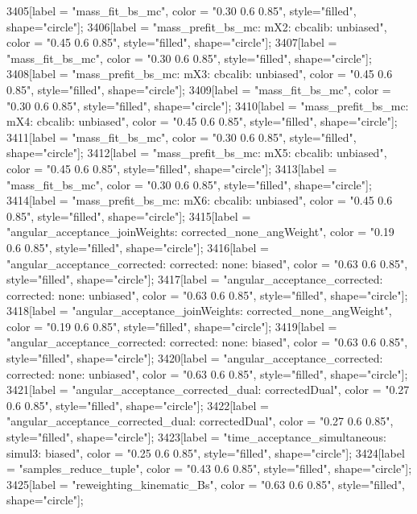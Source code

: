 {	3405[label = "mass_fit_bs_mc", color = "0.30 0.6 0.85", style="filled", shape="circle"];
	3406[label = "mass_prefit_bs_mc\nmassbin: mX2\nmassmodel: cbcalib\ntrigger: unbiased", color = "0.45 0.6 0.85", style="filled", shape="circle"];
	3407[label = "mass_fit_bs_mc", color = "0.30 0.6 0.85", style="filled", shape="circle"];
	3408[label = "mass_prefit_bs_mc\nmassbin: mX3\nmassmodel: cbcalib\ntrigger: unbiased", color = "0.45 0.6 0.85", style="filled", shape="circle"];
	3409[label = "mass_fit_bs_mc", color = "0.30 0.6 0.85", style="filled", shape="circle"];
	3410[label = "mass_prefit_bs_mc\nmassbin: mX4\nmassmodel: cbcalib\ntrigger: unbiased", color = "0.45 0.6 0.85", style="filled", shape="circle"];
	3411[label = "mass_fit_bs_mc", color = "0.30 0.6 0.85", style="filled", shape="circle"];
	3412[label = "mass_prefit_bs_mc\nmassbin: mX5\nmassmodel: cbcalib\ntrigger: unbiased", color = "0.45 0.6 0.85", style="filled", shape="circle"];
	3413[label = "mass_fit_bs_mc", color = "0.30 0.6 0.85", style="filled", shape="circle"];
	3414[label = "mass_prefit_bs_mc\nmassbin: mX6\nmassmodel: cbcalib\ntrigger: unbiased", color = "0.45 0.6 0.85", style="filled", shape="circle"];
	3415[label = "angular_acceptance_joinWeights\nwflag: corrected_none_angWeight", color = "0.19 0.6 0.85", style="filled", shape="circle"];
	3416[label = "angular_acceptance_corrected\nangacc: corrected\ncsp: none\ntrigger: biased", color = "0.63 0.6 0.85", style="filled", shape="circle"];
	3417[label = "angular_acceptance_corrected\nangacc: corrected\ncsp: none\ntrigger: unbiased", color = "0.63 0.6 0.85", style="filled", shape="circle"];
	3418[label = "angular_acceptance_joinWeights\nwflag: corrected_none_angWeight", color = "0.19 0.6 0.85", style="filled", shape="circle"];
	3419[label = "angular_acceptance_corrected\nangacc: corrected\ncsp: none\ntrigger: biased", color = "0.63 0.6 0.85", style="filled", shape="circle"];
	3420[label = "angular_acceptance_corrected\nangacc: corrected\ncsp: none\ntrigger: unbiased", color = "0.63 0.6 0.85", style="filled", shape="circle"];
	3421[label = "angular_acceptance_corrected_dual\nstep: correctedDual", color = "0.27 0.6 0.85", style="filled", shape="circle"];
	3422[label = "angular_acceptance_corrected_dual\nstep: correctedDual", color = "0.27 0.6 0.85", style="filled", shape="circle"];
	3423[label = "time_acceptance_simultaneous\ntimeacc: simul3\ntrigger: biased", color = "0.25 0.6 0.85", style="filled", shape="circle"];
	3424[label = "samples_reduce_tuple", color = "0.43 0.6 0.85", style="filled", shape="circle"];
	3425[label = "reweighting_kinematic_Bs", color = "0.63 0.6 0.85", style="filled", shape="circle"];
}
